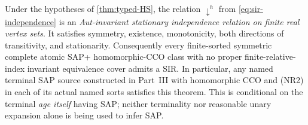 \begin{theorem}
\label{thm:sir-HS-positive}
Under the hypotheses of
\cref{thm:typed-HS}, the relation
\(\downarrow^h\) from
\eqref{eq:sir-independence} is an
\emph{Aut-invariant stationary independence
relation on finite real vertex sets}.
It satisfies symmetry, existence,
monotonicity, both directions of
transitivity, and stationarity.
Consequently every finite-sorted
symmetric complete atomic SAP+
homomorphic-CCO class with no proper
finite-relative-index invariant
equivalence cover admits a SIR.
In particular, any named terminal SAP source
constructed in Part~III with homomorphic CCO
and (NR2) in each of its actual named sorts
satisfies this theorem. This is conditional
on the terminal \emph{age itself} having SAP;
neither terminality nor reasonable unary
expansion alone is being used to infer SAP.
\end{theorem}
